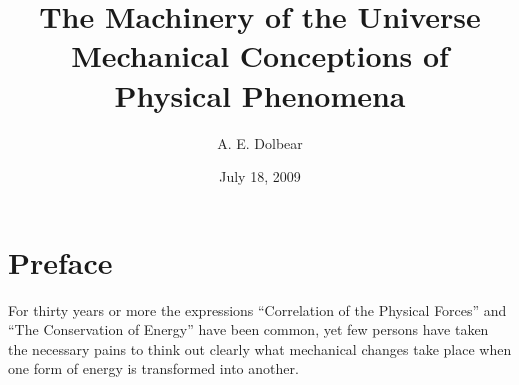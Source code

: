 \documentclass[12pt,oneside]{book}
\begin{document}
    
\frontmatter

\title{The Machinery of the Universe\\Mechanical Conceptions of Physical Phenomena}
\author{A. E. Dolbear}
\date{July 18, 2009}
\maketitle

\chapter{Preface}
For thirty years or more the expressions ``Correlation of the Physical Forces'' and ``The Conservation of Energy'' have been common, yet few persons have taken the
necessary pains to think out clearly what mechanical changes take place when one form of energy is transformed into another. \par 
\end{document}
